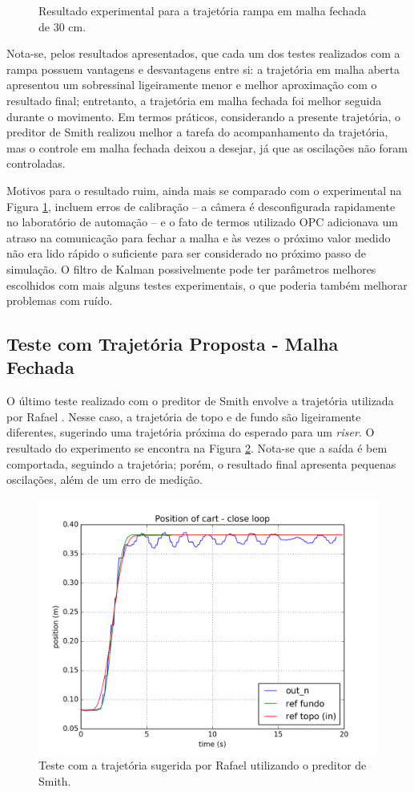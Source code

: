 \begin{figure}[!ht]
\begin{minipage}{0.45\textwidth}
\caption{Resultado experimental para a trajetória rampa em malha fechada de 30 cm. \label{malhaFechadaRampa}}
\end{minipage}
\end{figure}

Nota-se, pelos resultados apresentados, que cada um dos testes realizados com a rampa possuem vantagens e desvantagens entre si: a trajetória em malha aberta apresentou um sobressinal ligeiramente menor e melhor aproximação com o resultado final; entretanto, a trajetória em malha fechada foi melhor seguida durante o movimento. Em termos práticos, considerando a presente trajetória, o preditor de Smith realizou melhor a tarefa do acompanhamento da trajetória, mas o controle em malha fechada deixou a desejar, já que as oscilações não foram controladas. 

Motivos para o resultado ruim, ainda mais se comparado com o experimental na Figura \ref{malhaFechadaRampa}, incluem erros de calibração -- a câmera é desconfigurada rapidamente no laboratório de automação -- e o fato de termos utilizado OPC adicionava um atraso na comunicação para fechar a malha e às vezes o próximo valor medido não era lido rápido o suficiente para ser considerado no próximo passo de simulação. O filtro de Kalman possivelmente pode ter parâmetros melhores escolhidos com mais alguns testes experimentais, o que poderia também melhorar problemas com ruído.

\subsection{Teste com Trajetória Proposta - Malha Fechada}
O último teste realizado com o preditor de Smith envolve a trajetória utilizada por Rafael \cite{rafaelMestrado}. Nesse caso, a trajetória de topo e de fundo são ligeiramente diferentes, sugerindo uma trajetória próxima do esperado para um \textit{riser}. O resultado do experimento se encontra na Figura \ref{experimentoRafael}. Nota-se que a saída é bem comportada, seguindo a trajetória; porém, o resultado final apresenta pequenas oscilações, além de um erro de medição. 

\begin{figure}[!ht]
\centering
\includegraphics[width=.6\linewidth]{figs/resultados/experimento/closed_loop_trajetoria_rafael}
\caption{Teste com a trajetória sugerida por Rafael utilizando o preditor de Smith. \label{experimentoRafael}}
\end{figure} 

